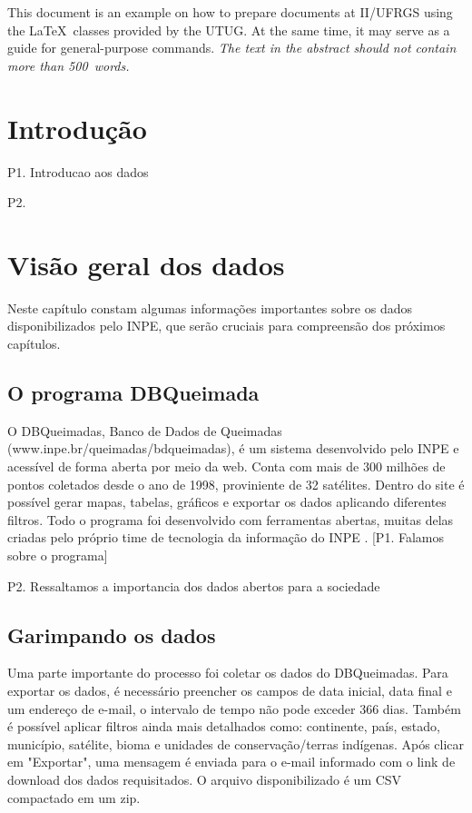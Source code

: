 \documentclass[cic,tc]{iiufrgs}
\begin{document}
\begin{translatedabstract}
This document is an example on how to prepare documents at II/UFRGS
using the \LaTeX\ classes provided by the UTUG\@. At the same time, it
may serve as a guide for general-purpose commands. \emph{The text in
the abstract should not contain more than 500~words.}
\end{translatedabstract}


\chapter{Introdução}
P1. Introducao aos dados \par
P2. 


\chapter{Visão geral dos dados}

Neste capítulo constam algumas informações importantes sobre os 
dados disponibilizados pelo INPE, que serão cruciais para compreensão 
dos próximos capítulos. 

\section{O programa DBQueimada}

O DBQueimadas, Banco de Dados de Queimadas (www.inpe.br/queimadas/bdqueimadas),
é um sistema desenvolvido pelo INPE e acessível de forma aberta por meio da web. 
Conta com mais de 300 milhões de pontos coletados desde o ano de 1998, 
proviniente de 32 satélites. Dentro do site é possível gerar mapas,
tabelas, gráficos e exportar os dados aplicando diferentes filtros. Todo o 
programa foi desenvolvido com ferramentas abertas, muitas delas 
criadas pelo próprio time de tecnologia da informação do INPE 
\citep{setzer2019banco}. [P1. Falamos sobre o programa] \par

P2. Ressaltamos a importancia dos dados abertos para a sociedade \par


\section{Garimpando os dados}

Uma parte importante do processo foi coletar os dados do DBQueimadas. 
Para exportar os dados, é necessário preencher os campos de data inicial,
data final e um endereço de e-mail, o intervalo de tempo não 
pode exceder 366 dias. Também é possível aplicar filtros ainda mais 
detalhados como: continente, país, estado, município, satélite, bioma e 
unidades de conservação/terras indígenas. Após clicar em "Exportar", 
uma mensagem é enviada para o e-mail informado com o link de download 
dos dados requisitados. O arquivo disponibilizado é um CSV compactado 
em um zip.\par
\end{document}
